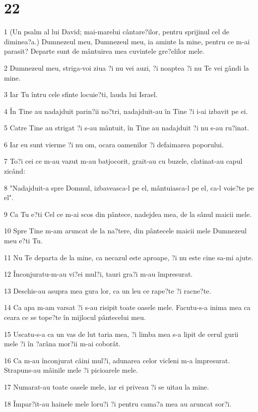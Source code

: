 \chapter{22}

\par 1 (Un psalm al lui David; mai-marelui cântare?ilor, pentru sprijinul cel de diminea?a.) Dumnezeul meu, Dumnezeul meu, ia aminte la mine, pentru ce m-ai parasit? Departe sunt de mântuirea mea cuvintele gre?elilor mele.
\par 2 Dumnezeul meu, striga-voi ziua ?i nu vei auzi, ?i noaptea ?i nu Te vei gândi la mine.
\par 3 Iar Tu întru cele sfinte locuie?ti, lauda lui Israel.
\par 4 În Tine au nadajduit parin?ii no?tri, nadajduit-au în Tine ?i i-ai izbavit pe ei.
\par 5 Catre Tine au strigat ?i s-au mântuit, în Tine au nadajduit ?i nu s-au ru?inat.
\par 6 Iar eu sunt vierme ?i nu om, ocara oamenilor ?i defaimarea poporului.
\par 7 To?i cei ce m-au vazut m-au batjocorit, grait-au cu buzele, clatinat-au capul zicând:
\par 8 "Nadajduit-a spre Domnul, izbaveasca-l pe el, mântuiasca-l pe el, ca-l voie?te pe el".
\par 9 Ca Tu e?ti Cel ce m-ai scos din pântece, nadejdea mea, de la sânul maicii mele.
\par 10 Spre Tine m-am aruncat de la na?tere, din pântecele maicii mele Dumnezeul meu e?ti Tu.
\par 11 Nu Te departa de la mine, ca necazul este aproape, ?i nu este cine sa-mi ajute.
\par 12 Înconjuratu-m-au vi?ei mul?i, tauri gra?i m-au împresurat.
\par 13 Deschis-au asupra mea gura lor, ca un leu ce rape?te ?i racne?te.
\par 14 Ca apa m-am varsat ?i s-au risipit toate oasele mele. Facutu-s-a inima mea ca ceara ce se tope?te în mijlocul pântecelui meu.
\par 15 Uscatu-s-a ca un vas de lut taria mea, ?i limba mea s-a lipit de cerul gurii mele ?i în ?arâna mor?ii m-ai coborât.
\par 16 Ca m-au înconjurat câini mul?i, adunarea celor vicleni m-a împresurat. Strapuns-au mâinile mele ?i picioarele mele.
\par 17 Numarat-au toate oasele mele, iar ei priveau ?i se uitau la mine.
\par 18 Împar?it-au hainele mele loru?i ?i pentru cama?a mea au aruncat sor?i.

